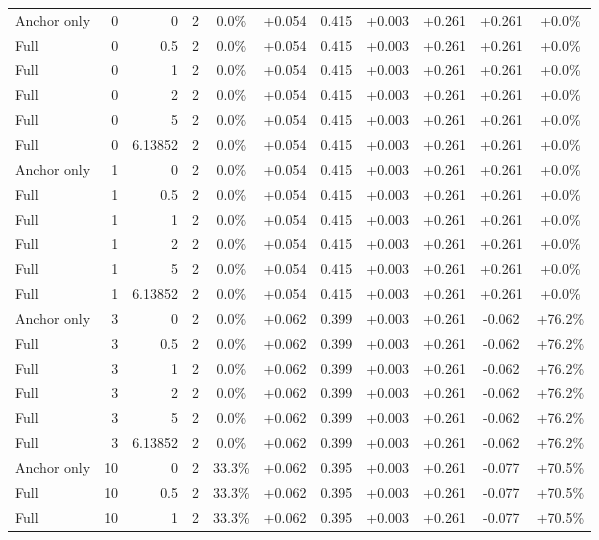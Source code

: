 \begin{table}[htbp]
\begin{tabular}{lrrrccccccc}
Anchor only & 0 & 0 & 2 & 0.0\% & +0.054 & 0.415 & +0.003 & +0.261 & +0.261 & +0.0\% \\
Full & 0 & 0.5 & 2 & 0.0\% & +0.054 & 0.415 & +0.003 & +0.261 & +0.261 & +0.0\% \\
Full & 0 & 1 & 2 & 0.0\% & +0.054 & 0.415 & +0.003 & +0.261 & +0.261 & +0.0\% \\
Full & 0 & 2 & 2 & 0.0\% & +0.054 & 0.415 & +0.003 & +0.261 & +0.261 & +0.0\% \\
Full & 0 & 5 & 2 & 0.0\% & +0.054 & 0.415 & +0.003 & +0.261 & +0.261 & +0.0\% \\
Full & 0 & 6.13852 & 2 & 0.0\% & +0.054 & 0.415 & +0.003 & +0.261 & +0.261 & +0.0\% \\
Anchor only & 1 & 0 & 2 & 0.0\% & +0.054 & 0.415 & +0.003 & +0.261 & +0.261 & +0.0\% \\
Full & 1 & 0.5 & 2 & 0.0\% & +0.054 & 0.415 & +0.003 & +0.261 & +0.261 & +0.0\% \\
Full & 1 & 1 & 2 & 0.0\% & +0.054 & 0.415 & +0.003 & +0.261 & +0.261 & +0.0\% \\
Full & 1 & 2 & 2 & 0.0\% & +0.054 & 0.415 & +0.003 & +0.261 & +0.261 & +0.0\% \\
Full & 1 & 5 & 2 & 0.0\% & +0.054 & 0.415 & +0.003 & +0.261 & +0.261 & +0.0\% \\
Full & 1 & 6.13852 & 2 & 0.0\% & +0.054 & 0.415 & +0.003 & +0.261 & +0.261 & +0.0\% \\
Anchor only & 3 & 0 & 2 & 0.0\% & +0.062 & 0.399 & +0.003 & +0.261 & -0.062 & +76.2\% \\
Full & 3 & 0.5 & 2 & 0.0\% & +0.062 & 0.399 & +0.003 & +0.261 & -0.062 & +76.2\% \\
Full & 3 & 1 & 2 & 0.0\% & +0.062 & 0.399 & +0.003 & +0.261 & -0.062 & +76.2\% \\
Full & 3 & 2 & 2 & 0.0\% & +0.062 & 0.399 & +0.003 & +0.261 & -0.062 & +76.2\% \\
Full & 3 & 5 & 2 & 0.0\% & +0.062 & 0.399 & +0.003 & +0.261 & -0.062 & +76.2\% \\
Full & 3 & 6.13852 & 2 & 0.0\% & +0.062 & 0.399 & +0.003 & +0.261 & -0.062 & +76.2\% \\
Anchor only & 10 & 0 & 2 & 33.3\% & +0.062 & 0.395 & +0.003 & +0.261 & -0.077 & +70.5\% \\
Full & 10 & 0.5 & 2 & 33.3\% & +0.062 & 0.395 & +0.003 & +0.261 & -0.077 & +70.5\% \\
Full & 10 & 1 & 2 & 33.3\% & +0.062 & 0.395 & +0.003 & +0.261 & -0.077 & +70.5\% \\

\end{tabular}
\end{table}
